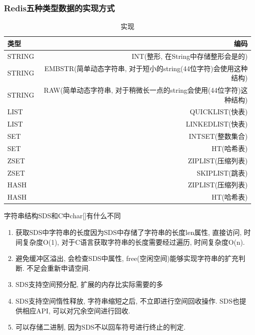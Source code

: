 \documentclass[UTF8]{ctexart}
\begin{document}
\subsubsection{Redis五种类型数据的实现方式}
\begin{table}[!htbp]
	\centering
	\caption{实现}
	\begin{tabular}{|l|r|}

		\hline
		类型   & 编码                                                                \\
		\hline
		STRING & INT(整形, 在String中存储整形会是的)                                 \\
		\hline
		STRING & EMBSTR(简单动态字符串, 对于短小的string(44位字符)会使用这种结构)    \\
		\hline
		STRING & RAW(简单动态字符串, 对于稍微长一点的string会使用(44位字符)这种结构) \\
		\hline
		LIST   & QUICKLIST(快表)                                                     \\
		\hline
		LIST   & LINKEDLIST(快表)                                                    \\
		\hline
		SET    & INTSET(整数集合)                                                    \\
		\hline
		SET    & HT(哈希表)                                                          \\
		\hline
		ZSET   & ZIPLIST(压缩列表)                                                   \\
		\hline
		ZSET   & SKIPLIST(跳表)                                                      \\
		\hline
		HASH   & ZIPLIST(压缩列表)                                                   \\
		\hline
		HASH   & HT(哈希表)                                                          \\
		\hline
	\end{tabular}
\end{table}
字符串结构SDS和C中char[]有什么不同
\begin{enumerate}
	\item 获取SDS中字符串的长度因为SDS中存储了字符串的长度len属性, 直接访问, 时间复杂度O(1), 对于C语言获取字符串的长度需要经过遍历, 时间复杂度O(n).
	\item 避免缓冲区溢出, 会检查SDS中属性, free(空闲空间)能够实现字符串的扩充判断. 不足会重新申请空间.
	\item SDS支持空间预分配, 扩展的内存比实际需要的多
	\item SDS支持空间惰性释放, 字符串缩短之后, 不立即进行空间回收操作. SDS也提供相应API, 可以对冗余空间进行回收.
	\item 可以存储二进制, 因为SDS不以回车符号进行终止的判定.
\end{enumerate}
\end{document}
